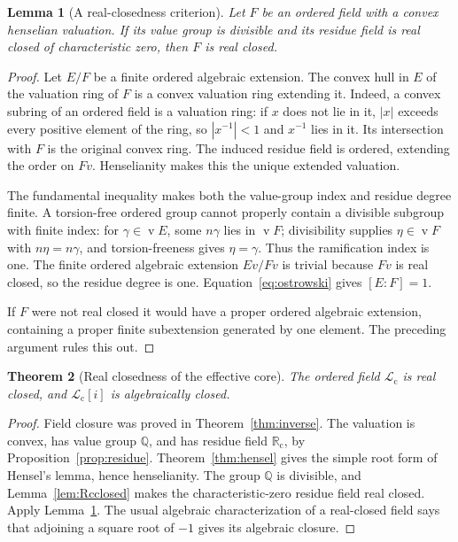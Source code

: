 \documentclass[11pt,letterpaper]{article}
\numberwithin{equation}{section}
\newtheorem{theorem}{Theorem}[section]
\newtheorem{lemma}[theorem]{Lemma}
\theoremstyle{definition}
\theoremstyle{remark}
\newcommand{\Rc}{\mathbb R_{\mathrm c}}
\newcommand{\Lc}{\mathcal L_{\mathrm c}}
\newcommand{\Q}{\mathbb Q}
\newcommand{\val}{\operatorname{v}}
\begin{document}
\begin{lemma}[A real-closedness criterion]
\label{lem:valuationRC}
Let $F$ be an ordered field with a convex henselian valuation. If its value
group is divisible and its residue field is real closed of characteristic
zero, then $F$ is real closed.
\end{lemma}
\begin{proof}
Let $E/F$ be a finite ordered algebraic extension. The convex hull in $E$
of the valuation ring of $F$ is a convex valuation ring extending it.
Indeed, a convex subring of an ordered field is a valuation ring: if
$x$ does not lie in it, $|x|$ exceeds every positive element of the ring,
so $|x^{-1}|<1$ and $x^{-1}$ lies in it. Its intersection with $F$ is the
original convex ring. The induced residue field is ordered, extending the
order on $Fv$. Henselianity makes this the unique extended valuation.

The fundamental inequality makes both the value-group index and residue
degree finite. A torsion-free ordered group cannot properly contain a
divisible subgroup with finite index: for $\gamma\in\val E$, some
$n\gamma$ lies in $\val F$; divisibility supplies $\eta\in\val F$ with
$n\eta=n\gamma$, and torsion-freeness gives $\eta=\gamma$. Thus the
ramification index is one. The finite ordered algebraic extension $Ev/Fv$
is trivial because $Fv$ is real closed, so the residue degree is one.
Equation~\eqref{eq:ostrowski} gives $[E:F]=1$.

If $F$ were not real closed it would have a proper ordered algebraic
extension, containing a proper finite subextension generated by one element.
The preceding argument rules this out.
\end{proof}

\begin{theorem}[Real closedness of the effective core]
\label{thm:Lcrealclosed}
The ordered field $\Lc$ is real closed, and $\Lc[i]$ is algebraically
closed.
\end{theorem}
\begin{proof}
Field closure was proved in Theorem~\ref{thm:inverse}. The valuation is
convex, has value group $\Q$, and has residue field $\Rc$, by
Proposition~\ref{prop:residue}. Theorem~\ref{thm:hensel} gives the simple
root form of Hensel's lemma, hence henselianity. The group $\Q$ is divisible,
and Lemma~\ref{lem:Rcclosed} makes the characteristic-zero residue field
real closed. Apply Lemma~\ref{lem:valuationRC}. The usual algebraic
characterization of a real-closed field says that adjoining a square root
of $-1$ gives its algebraic closure.
\end{proof}
\end{document}
